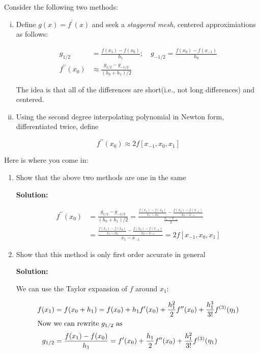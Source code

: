\documentclass[12pt]{article}
\newcommand{\pprime}{\prime \prime}
\begin{document}
\begin{enumerate}
Consider the following two methods:

\begin{enumerate}[i.]
\item Define $g(x) = f^{\prime}(x)$ and seek a {\em staggered mesh}, centered approximiations as follows:

\begin{align*}
g_{1/2} &= \frac{f(x_{1}) - f(x_{0})}{h_{1}};\quad g_{-1/2} = \frac{f(x_{0}) - f(x_{-1})}{h_{0}}\\
f^{\prime \prime}(x_{0}) &\approx \frac{g_{1/2} - g_{-1/2}}{(h_{0} + h_{1})/2}
\end{align*}

The idea is that all of the differences are short(i.e., not long differences) and centered.

\item Using the second degree interpolating polynomial in Newton form, differentiated twice, define

\[
f^{\prime \prime}(x_{0}) \approx 2f[x_{-1}, x_{0}, x_{1}]
\]

\end{enumerate}

Here is where you come in:

\begin{enumerate}
\item Show that the above two methods are one in the same

{\bf Solution:}

\begin{align*}
f^{\pprime}(x_{0}) &= \frac{g_{1/2} - g_{-1/2}}{(h_{0} + h_{1})/2} = \frac{\frac{f(x_{1}) - f(x_{0})}{x_{1} - x_{0}} - \frac{f(x_{0}) - f(x_{-1})}{x_{0} - x_{-1}}}{\frac{x_{1} - x_{-1}}{2}}\\
&= \frac{\frac{f(x_{1}) - f(x_{0})}{x_{1} - x_{0}} - \frac{f(x_{0}) - f(x_{-1})}{x_{0} - x_{-1}}}{x_{1} - x_{-1}} = 2f[x_{-1}, x_{0}, x_{1}]
\end{align*}

\item Show that this method is only first order accurate in general

{\bf Solution:}

We can use the Taylor expansion of $f$ around $x_{1}$:

\begin{align*}
f(x_{1}) &= f(x_{0} + h_{1}) = f(x_{0}) + h_{1}f^{\prime}(x_{0}) + \frac{h_{1}^{2}}{2}f^{\pprime}(x_{0}) + \frac{h_{1}^{3}}{3!}f^{(3)}(\eta_{1})\\
\intertext{Now we can rewrite $g_{1/2}$ as}
g_{1/2} &= \frac{f(x_{1}) - f(x_{0})}{h_{1}} = f^{\prime}(x_{0}) + \frac{h_{1}}{2}f^{\pprime}(x_{0}) + \frac{h_{1}^{2}}{3!}f^{(3)}(\eta_{1})
\end{align*}


\end{enumerate}
\end{enumerate}
\end{document}
